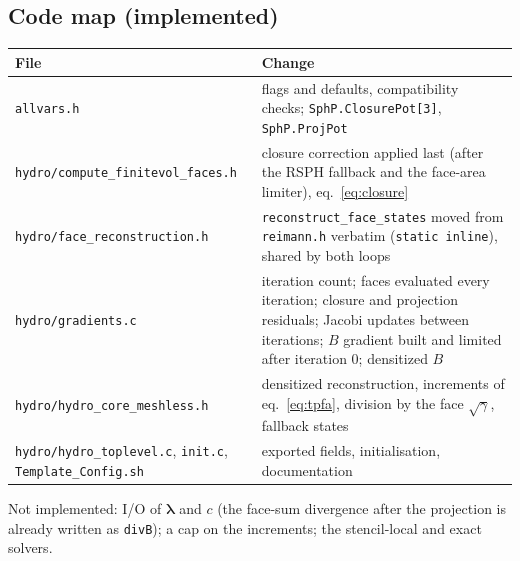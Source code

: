 \documentclass[11pt,a4paper]{article}
\newcommand{\sg}{\sqrt{\gamma}}
\newcommand{\code}[1]{\texttt{#1}}
\begin{document}
\subsection{Code map (implemented)}
\begin{center}\small
\begin{tabular}{>{\raggedright\arraybackslash}p{3.6cm}>{\raggedright\arraybackslash}p{10.8cm}}
\toprule
File & Change\\
\midrule
\code{allvars.h} & flags and defaults, compatibility checks; \code{SphP.ClosurePot[3]}, \code{SphP.ProjPot}\\
\code{hydro/compute\_finitevol\_faces.h} & closure correction applied last (after the RSPH fallback and the face-area limiter), eq.~\eqref{eq:closure}\\
\code{hydro/face\_reconstruction.h} & \code{reconstruct\_face\_states} moved from \code{reimann.h} verbatim (\code{static inline}), shared by both loops\\
\code{hydro/gradients.c} & iteration count; faces evaluated every iteration; closure and projection residuals; Jacobi updates between iterations; $B$ gradient built and limited after iteration 0; densitized $B$\\
\code{hydro/hydro\_core\_meshless.h} & densitized reconstruction, increments of eq.~\eqref{eq:tpfa}, division by the face $\sg$, fallback states\\
\code{hydro/hydro\_toplevel.c}, \code{init.c}, \code{Template\_Config.sh} & exported fields, initialisation, documentation\\
\bottomrule
\end{tabular}
\end{center}
Not implemented: I/O of $\bm\lambda$ and $c$ (the face-sum divergence after the projection is already written as \code{divB}); a cap on the increments; the stencil-local and exact solvers.
\end{document}
